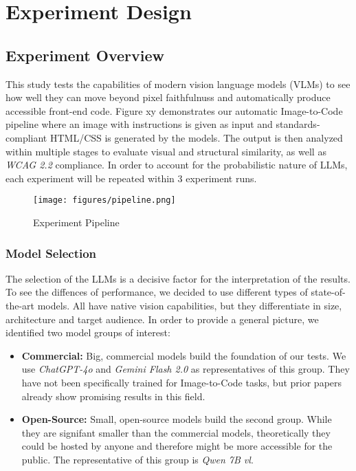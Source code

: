 \chapter{Experiment Design}\label{chapter:Experiment}

\section{Experiment Overview}
This study tests the capabilities of modern vision language models (VLMs) 
to see how well they can move beyond pixel faithfulnuss and automatically
produce accessible front-end code. 
Figure xy demonstrates our automatic Image-to-Code pipeline where an 
image with instructions is given as input and standards-compliant HTML/CSS 
is generated by the models.
The output is then analyzed within multiple stages to evaluate visual 
and structural similarity, as well as \textit{WCAG 2.2} compliance.\newline
In order to account for the probabilistic nature of LLMs, each experiment 
will be repeated within 3 experiment runs.

\begin{figure*}[p]
  \centering
  \texttt{[image: figures/pipeline.png]}
  \caption{Experiment Pipeline}
  \label{fig:pipeline}
\end{figure*}


\subsection{Model Selection}
The selection of the LLMs is a decisive factor for the interpretation of the results.
To see the diffences of performance, we decided to use different types of 
state-of-the-art models. All have native vision capabilities, but they differentiate 
in size, architecture and target audience.
In order to provide a general picture, we identified two model groups of interest:
\begin{itemize}
  \item \textbf{Commercial:} Big, commercial models build the foundation of our tests.
    We use \textit{ChatGPT-4o} and \textit{Gemini Flash 2.0} as representatives of this group.
    They have not been specifically trained for Image-to-Code tasks, but prior papers 
    already show promising results in this field.
  \item \textbf{Open-Source:} Small, open-source models build the second group. 
    While they are signifant smaller than the commercial models, theoretically they 
    could be hosted by anyone and therefore might be more accessible for the public.
    The representative of this group is \textit{Qwen 7B vl}.
\end{itemize}


